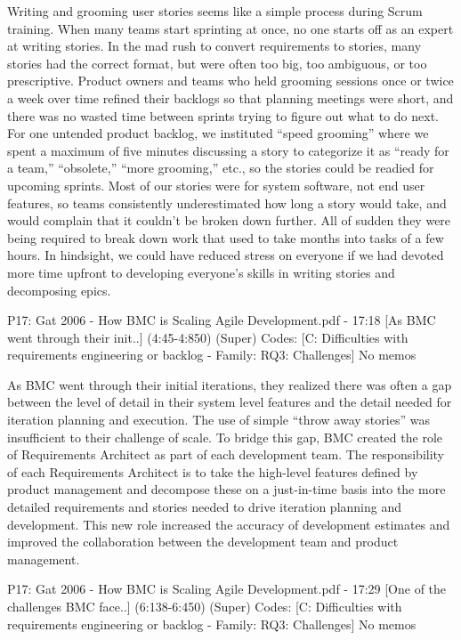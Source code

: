 \documentclass[preprint,authoryear,12pt]{elsarticle}
\begin{document}
Writing and 
grooming user stories seems like a simple process during 
Scrum training.  When many teams start sprinting at once, no 
one starts off as an expert at writing stories.  In the mad rush to 
convert requirements to stories, many stories had the correct 
format, but were often too big, too ambiguous, or too 
prescriptive.  Product owners and teams who held grooming 
sessions once or twice a week over time refined their backlogs 
so that planning meetings were short, and there was no wasted 
time between sprints trying to figure out what to do next.  For 
one untended product backlog, we instituted “speed grooming” 
where we spent a maximum of five minutes discussing a story 
to categorize it as “ready for a team,” “obsolete,” “more 
grooming,” etc., so the stories could be readied for upcoming 
sprints.  Most of our stories were for system software, not end 
user features, so teams consistently underestimated how long a 
story would take, and would complain that it couldn’t be 
broken down further.  All of sudden they were being required 
to break down work that used to take months into tasks of a 
few hours.  In hindsight, we could have reduced stress on 
everyone if we had devoted more time upfront to developing 
everyone’s skills in writing stories and decomposing epics.


P17: Gat 2006 - How BMC is Scaling Agile Development.pdf - 17:18 [As BMC went through their init..]  (4:45-4:850)   (Super)
Codes:	[C: Difficulties with requirements engineering or backlog - Family: RQ3: Challenges] 
No memos

As BMC went through their initial iterations, they
realized there was often a gap between the level of
detail in their system level features and the detail
needed for iteration planning and execution. The use of
simple “throw away stories” was insufficient to their
challenge of scale. To bridge this gap, BMC created
the role of Requirements Architect as part of each
development team.
The responsibility of each Requirements Architect
is to take the high-level features defined by product
management and decompose these on a just-in-time
basis into the more detailed requirements and stories
needed to drive iteration planning and development.
This new role increased the accuracy of development
estimates and improved the collaboration between the
development team and product management.


P17: Gat 2006 - How BMC is Scaling Agile Development.pdf - 17:29 [One of the challenges BMC face..]  (6:138-6:450)   (Super)
Codes:	[C: Difficulties with requirements engineering or backlog - Family: RQ3: Challenges] 
No memos
\end{document}
